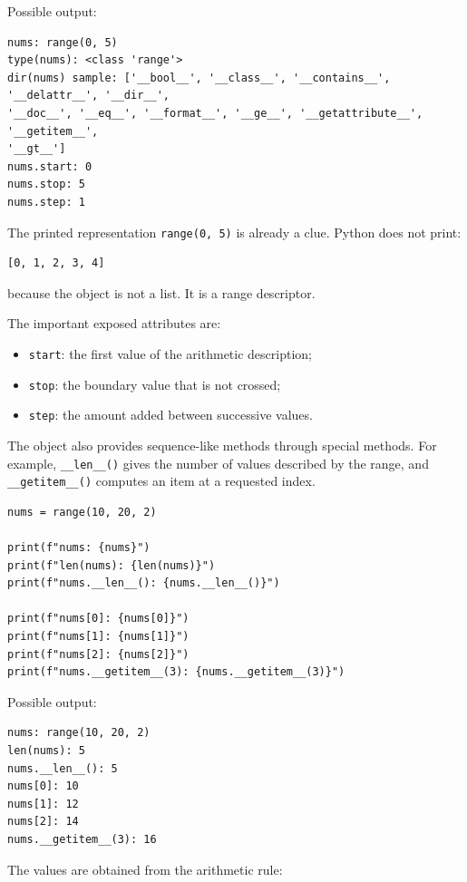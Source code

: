Possible output:

\begin{verbatim}
nums: range(0, 5)
type(nums): <class 'range'>
dir(nums) sample: ['__bool__', '__class__', '__contains__', '__delattr__', '__dir__',
'__doc__', '__eq__', '__format__', '__ge__', '__getattribute__', '__getitem__',
'__gt__']
nums.start: 0
nums.stop: 5
nums.step: 1
\end{verbatim}

The printed representation \texttt{range(0, 5)} is already a clue. Python does not print:

\begin{verbatim}
[0, 1, 2, 3, 4]
\end{verbatim}

because the object is not a list. It is a range descriptor.

The important exposed attributes are:

\begin{itemize}
    \item \texttt{start}: the first value of the arithmetic description;
    \item \texttt{stop}: the boundary value that is not crossed;
    \item \texttt{step}: the amount added between successive values.
\end{itemize}

The object also provides sequence-like methods through special methods. For example, \texttt{\_\_len\_\_()} gives the number of values described by the range, and \texttt{\_\_getitem\_\_()} computes an item at a requested index.

\begin{verbatim}
nums = range(10, 20, 2)

print(f"nums: {nums}")
print(f"len(nums): {len(nums)}")
print(f"nums.__len__(): {nums.__len__()}")

print(f"nums[0]: {nums[0]}")
print(f"nums[1]: {nums[1]}")
print(f"nums[2]: {nums[2]}")
print(f"nums.__getitem__(3): {nums.__getitem__(3)}")
\end{verbatim}

Possible output:

\begin{verbatim}
nums: range(10, 20, 2)
len(nums): 5
nums.__len__(): 5
nums[0]: 10
nums[1]: 12
nums[2]: 14
nums.__getitem__(3): 16
\end{verbatim}

The values are obtained from the arithmetic rule:

